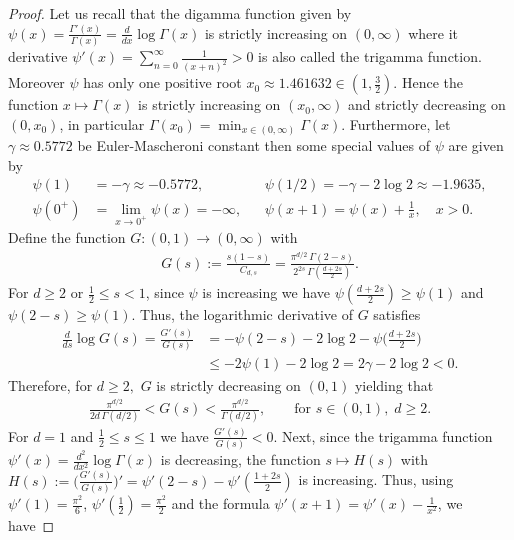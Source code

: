 \documentclass[12pt, reqno]{amsart}%
\theoremstyle{plain}  %
\theoremstyle{definition}  %
\theoremstyle{remark}
\numberwithin{equation}{section}
\begin{document}
\begin{proof}
Let us recall that the digamma  function given by $\psi(x)=\frac{\Gamma'(x)}{\Gamma(x)}= \frac{d}{d x}\log \Gamma (x)$ is strictly increasing on $(0,\infty)$ where it derivative $\psi'(x)=\sum_{n=0}^\infty \frac{1}{(x+n)^2}>0$ is also called the trigamma function. Moreover $\psi$ has only one positive root $x_0 \approx 1.461632 \in (1,\frac{3}{2})$. Hence the function  $x\mapsto \Gamma(x)$ is strictly increasing on $(x_0,\infty)$ and strictly decreasing on $(0, x_0)$, in particular $\Gamma(x_0)=\min_{x\in (0,\infty)}\Gamma(x)$. Furthermore, let $\gamma \approx 0.5772$ be  Euler-Mascheroni constant then some special values  of $\psi$ are given by
\begin{align*}
 \psi(1)&= -\gamma \approx -0.5772,\qquad && \psi(1/2)= -\gamma -2\log2 \approx -1.9635, \\
\psi(0^+)&= \lim_{x\to 0^+} \psi(x) = -\infty,&& \psi(x+1)=\psi(x)+\frac{1}{x},\quad x>0.
\end{align*}
Define the function $G: (0,1)\to (0,\infty)$ with
\begin{align*}
G(s) :=\frac{s(1-s)}{C_{d,s}}=\frac{\pi^{d/2} \, \Gamma(2 - s)}{2^{2s} \, \Gamma\left( \frac{d + 2s}{2} \right)}.
\end{align*}
For  $d\geq 2$ or $\frac12\leq s<1$, since $\psi$ is increasing  we have $\psi(\frac{d+2s}{2})\geq \psi(1)$  and $\psi(2-s)\geq \psi(1)$. Thus, the logarithmic derivative of $G$ satisfies
\begin{align*}
\frac{d}{ds}\log G(s)= \frac{G'(s)}{G(s)} &= -\psi(2-s) - 2 \log 2 - \psi\Big(\frac{d+2s}{2}\Big) \\
&\leq
 -2\psi(1) - 2 \log 2 =2\gamma- 2 \log 2<0 .
\end{align*}
Therefore, for $d\geq 2,$ $G$ is strictly decreasing on $(0,1)$ yielding that
\begin{align*}
\frac{\pi^{d/2}}{2d\,\Gamma(d/2)}
<G(s)<
\frac{\pi^{d/2}}{\Gamma(d/2)},
\qquad
\text{for } s \in (0,1), \; d \geq 2.
\end{align*}
For $d=1$  and $\frac{1}{2}\leq s\leq 1$ we have  $\frac{G'(s)}{G(s)}<0$. Next, since the trigamma function $\psi'(x)= \frac{d^2}{dx^2}\log\Gamma(x)$ is decreasing, the function $s\mapsto H(s)$ with $H(s):=\big(\tfrac{G'(s)}{G(s)} \big)'= \psi'(2-s)  -\psi'(\frac{1+2s}{2})$ is increasing. Thus, using $\psi'(1)= \frac{\pi^2}{6}$,  $\psi'(\frac{1}{2})= \frac{\pi^2}{2}$ and the formula $\psi'(x+1)=\psi'(x)-\frac{1}{x^2}$, we have

\end{proof}
\end{document}
